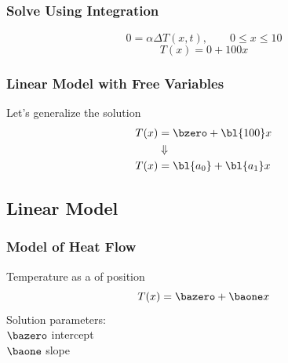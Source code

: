 \subsection{\eqnLaplace}
%
\begin{frame}\frametitle{Solve Using Integration}
\begin{equation}
	0 = \alpha \Delta T(x,t) , \qquad 0 \le x \le 10
\label{eq:pde heat}
\end{equation}
\begin{equation}
	T(x) = 0 + 100 x
\label{eq:exact}
\end{equation}
%
\end{frame}
%
%
\begin{frame}\frametitle{Linear Model with Free Variables}
Let's generalize the solution
\begin{equation}
\begin{split}
	T(x) &= \bzero + \bl{100} x\\
		& \Downarrow \\
	T(x) &= \bl{a_{0}} + \bl{a_{1}} x
\end{split}
\end{equation}
\end{frame}


\subsection{Linear Model}

\begin{frame}\frametitle{Model of Heat Flow}
\center
Temperature as a  of position
\begin{equation}
	T(x) = \bazero + \baone x
\label{eq:model}
\end{equation}
%
Solution parameters: \\
$\bazero$ intercept \\
$\baone$ slope
\end{frame}

